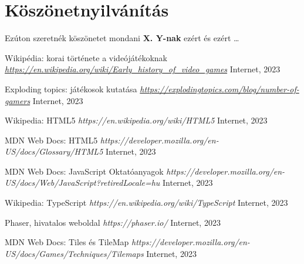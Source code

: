 \documentclass[12pt, a4paper]{report}
\theoremstyle{definition}
\begin{document}
	
	
	
	
	\chapter*{Köszönetnyilvánítás}
	
	Ezúton szeretnék köszönetet mondani \textbf{X. Y-nak} ezért és ezért \ldots
	
	
	
	
	\begin{thebibliography}{9}
		
		
		
		
		Wikipédia: korai története a videójátékoknak
		\emph{\url{https://en.wikipedia.org/wiki/Early_history_of_video_games}}
		Internet, 2023
		
		Exploding topics: játékosok kutatása
		\emph{\url{https://explodingtopics.com/blog/number-of-gamers}}
		Internet, 2023
		
		Wikipedia: HTML5 
		\emph{https://en.wikipedia.org/wiki/HTML5}
		Internet, 2023
		
		MDN Web Docs: HTML5
		\emph{https://developer.mozilla.org/en-US/docs/Glossary/HTML5}
		Internet, 2023
		
		MDN Web Docs: JavaScript Oktatóanyagok
		\emph{https://developer.mozilla.org/en-US/docs/Web/JavaScript?retiredLocale=hu}
		Internet, 2023
		
		Wikipedia: TypeScript
		\emph{https://en.wikipedia.org/wiki/TypeScript}
		Internet, 2023
		
		Phaser, hivatalos weboldal
		\emph{https://phaser.io/}
		Internet, 2023
		
		MDN Web Docs: Tiles és TileMap
		\emph{https://developer.mozilla.org/en-US/docs/Games/Techniques/Tilemaps}
		Internet, 2023
		

\end{thebibliography}
\end{document}
